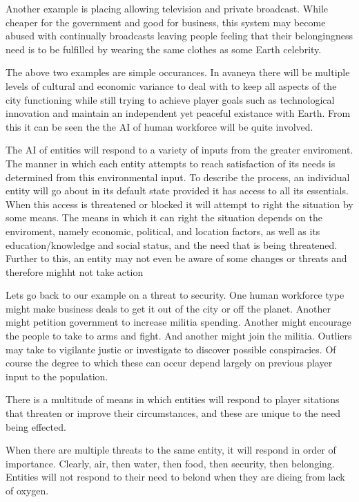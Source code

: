 Another example is placing allowing television and private broadcast. While cheaper for the government and good for business, this system may become abused with continually broadcasts leaving people feeling that their belongingness need is to be fulfilled by wearing the same clothes as some Earth celebrity. 

The above two examples are simple occurances. In avaneya there will be multiple levels of cultural and economic variance to deal with to keep all aspects of the city functioning while still trying to achieve player goals such as technological innovation and maintain an independent yet peaceful existance with Earth. From this it can be seen the the AI of human workforce will be quite involved.   

The AI of entities will respond to a variety of inputs from the greater enviroment. The manner in which each entity attempts to reach satisfaction of its needs is determined from this environmental input. To describe the process, an individual entity will go about in its default state provided it has access to all its essentials. When this access is threatened or blocked it will attempt to right the situation by some means. The means in which it can right the situation depends on the enviroment, namely economic, political, and location factors, as well as its education/knowledge and social status, and the need that is being threatened. Further to this, an entity may not even be aware of some changes or threats and therefore mighht not take action

Lets go back to our example on a threat to security. One human workforce type might make business deals to get it out of the city or off the planet. Another might petition government to increase militia spending. Another might encourage the people to take to arms and fight. And another might join the militia. Outliers may take to vigilante justic or investigate to discover possible conspiracies. Of course the degree to which these can occur depend largely on previous player input to the population.

There is a multitude of means in which entities will respond to player sitations that threaten or improve their circumstances, and these are unique to the need being effected.

When there are multiple threats to the same entity, it will respond in order of importance. Clearly, air, then water, then food, then security, then belonging. Entities will not respond to their need to belond when they are dieing from lack of oxygen.











 










